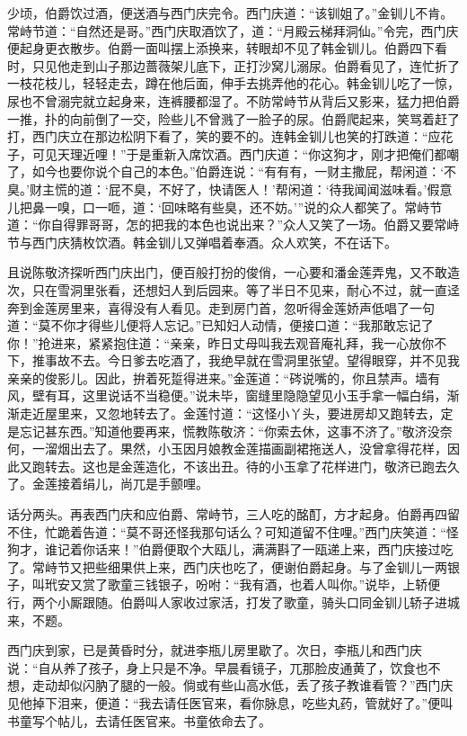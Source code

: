 少顷，伯爵饮过酒，便送酒与西门庆完令。西门庆道：“该钏姐了。”金钏儿不肯。常峙节道：“自然还是哥。”西门庆取酒饮了，道：“月殿云梯拜洞仙。”令完，西门庆便起身更衣散步。伯爵一面叫摆上添换来，转眼却不见了韩金钏儿。伯爵四下看时，只见他走到山子那边蔷薇架儿底下，正打沙窝儿溺尿。伯爵看见了，连忙折了一枝花枝儿，轻轻走去，蹲在他后面，伸手去挑弄他的花心。韩金钏儿吃了一惊，尿也不曾溺完就立起身来，连裤腰都湿了。不防常峙节从背后又影来，猛力把伯爵一推，扑的向前倒了一交，险些儿不曾溅了一脸子的尿。伯爵爬起来，笑骂着赶了打，西门庆立在那边松阴下看了，笑的要不的。连韩金钏儿也笑的打跌道：“应花子，可见天理近哩！”于是重新入席饮酒。西门庆道：“你这狗才，刚才把俺们都嘲了，如今也要你说个自己的本色。”伯爵连说：“有有有，一财主撒屁，帮闲道：‘不臭。’财主慌的道：‘屁不臭，不好了，快请医人！’帮闲道：‘待我闻闻滋味看。’假意儿把鼻一嗅，口一咂，道：‘回味略有些臭，还不妨。’”说的众人都笑了。常峙节道：“你自得罪哥哥，怎的把我的本色也说出来？”众人又笑了一场。伯爵又要常峙节与西门庆猜枚饮酒。韩金钏儿又弹唱着奉酒。众人欢笑，不在话下。

且说陈敬济探听西门庆出门，便百般打扮的俊俏，一心要和潘金莲弄鬼，又不敢造次，只在雪洞里张看，还想妇人到后园来。等了半日不见来，耐心不过，就一直迳奔到金莲房里来，喜得没有人看见。走到房门首，忽听得金莲娇声低唱了一句道：“莫不你才得些儿便将人忘记。”已知妇人动情，便接口道：“我那敢忘记了你！”抢进来，紧紧抱住道：“亲亲，昨日丈母叫我去观音庵礼拜，我一心放你不下，推事故不去。今日爹去吃酒了，我绝早就在雪洞里张望。望得眼穿，并不见我亲亲的俊影儿。因此，拚着死踅得进来。”金莲道：“硶说嘴的，你且禁声。墙有风，壁有耳，这里说话不当稳便。”说未毕，窗缝里隐隐望见小玉手拿一幅白绢，渐渐走近屋里来，又忽地转去了。金莲忖道：“这怪小丫头，要进房却又跑转去，定是忘记甚东西。”知道他要再来，慌教陈敬济：“你索去休，这事不济了。”敬济没奈何，一溜烟出去了。果然，小玉因月娘教金莲描画副裙拖送人，没曾拿得花样，因此又跑转去。这也是金莲造化，不该出丑。待的小玉拿了花样进门，敬济已跑去久了。金莲接着绢儿，尚兀是手颤哩。

话分两头。再表西门庆和应伯爵、常峙节，三人吃的酩酊，方才起身。伯爵再四留不住，忙跪着告道：“莫不哥还怪我那句话么？可知道留不住哩。”西门庆笑道：“怪狗才，谁记着你话来！”伯爵便取个大瓯儿，满满斟了一瓯递上来，西门庆接过吃了。常峙节又把些细果供上来，西门庆也吃了，便谢伯爵起身。与了金钏儿一两银子，叫玳安又赏了歌童三钱银子，吩咐：“我有酒，也着人叫你。”说毕，上轿便行，两个小厮跟随。伯爵叫人家收过家活，打发了歌童，骑头口同金钏儿轿子进城来，不题。

西门庆到家，已是黄昏时分，就进李瓶儿房里歇了。次日，李瓶儿和西门庆说：“自从养了孩子，身上只是不净。早晨看镜子，兀那脸皮通黄了，饮食也不想，走动却似闪肭了腿的一般。倘或有些山高水低，丢了孩子教谁看管？”西门庆见他掉下泪来，便道：“我去请任医官来，看你脉息，吃些丸药，管就好了。”便叫书童写个帖儿，去请任医官来。书童依命去了。


